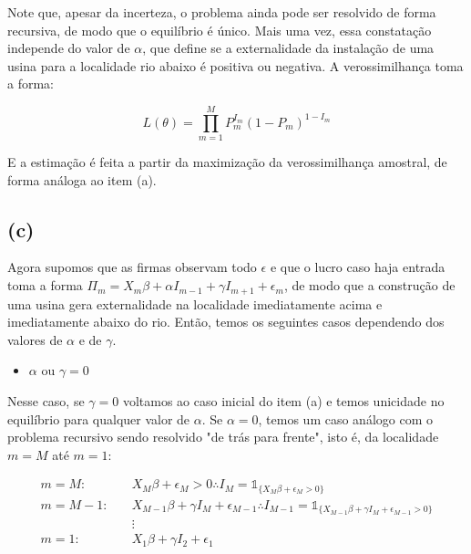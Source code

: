 \documentclass{article}
\begin{document}
Note que, apesar da incerteza, o problema ainda pode ser resolvido de forma recursiva, de modo que o equilíbrio é único. Mais uma vez, essa constatação independe do valor de $\alpha$, que define se a externalidade da instalação de uma usina para a localidade rio abaixo é positiva ou negativa. A verossimilhança toma a forma:

\begin{equation*}
    L(\theta) = \prod_{m=1}^{M} P_m ^{I_m} (1 - P_m)^{1 - I_m}
\end{equation*}

E a estimação é feita a partir da maximização da verossimilhança amostral, de forma análoga ao item (a).

\subsection*{(c)}

Agora supomos que as firmas observam todo $\epsilon$ e que o lucro caso haja entrada toma a forma $\Pi_m=X_m\beta+\alpha I_{m-1}+\gamma I_{m+1}+\epsilon_m$, de modo que a construção de uma usina gera externalidade na localidade imediatamente acima e imediatamente abaixo do rio. Então, temos os seguintes casos dependendo dos valores de $\alpha$ e de $\gamma$.

\begin{itemize}
    \item $\alpha$ ou $\gamma = 0$
\end{itemize}


Nesse caso, se $\gamma = 0$ voltamos ao caso inicial do item (a) e temos unicidade no equilíbrio para qualquer valor de $\alpha$. Se $\alpha = 0$, temos um caso análogo com o problema recursivo sendo resolvido "de trás para frente", isto é, da localidade $m = M$ até $m = 1$:

\begin{equation*}
\begin{aligned}
 m = M : \quad & X_M\beta+\epsilon_M > 0 \therefore I_M = \mathds{1}_{\{X_M\beta+\epsilon_M > 0\}} \\
 m = M - 1 : \quad & X_{M-1}\beta+\gamma I_{M}+\epsilon_{M-1} \therefore I_{M-1} = \mathds{1}_{\{X_{M-1}\beta+ \gamma I_M + \epsilon_{M-1} > 0\}} \\
 & \vdots \\
 m = 1 : \quad &  X_{1}\beta+\gamma I_{2}+\epsilon_{1}
\end{aligned}
\end{equation*}
\end{document}
